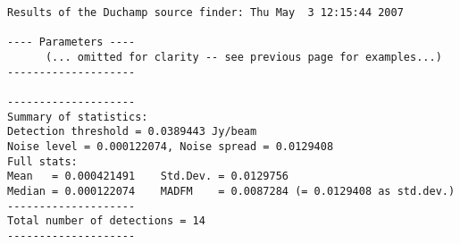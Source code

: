 {\footnotesize
\begin{verbatim}
Results of the Duchamp source finder: Thu May  3 12:15:44 2007

---- Parameters ----
      (... omitted for clarity -- see previous page for examples...)
--------------------

--------------------
Summary of statistics:
Detection threshold = 0.0389443 Jy/beam
Noise level = 0.000122074, Noise spread = 0.0129408
Full stats:
Mean   = 0.000421491    Std.Dev. = 0.0129756
Median = 0.000122074    MADFM    = 0.0087284 (= 0.0129408 as std.dev.)
--------------------
Total number of detections = 14
--------------------
\end{verbatim}
}
